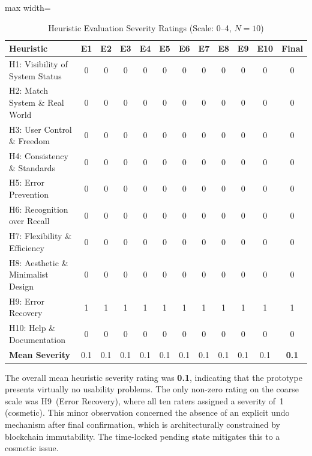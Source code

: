 \documentclass[journal,onecolumn]{IEEEtran}
\begin{document}
\begin{table}[htbp]
\centering
\caption{Heuristic Evaluation Severity Ratings (Scale: 0--4, $N=10$)}
\label{tab:heuristic-results}
\small
\begin{adjustbox}{max width=\columnwidth}
\begin{tabular}{|p{3.0cm}|c|c|c|c|c|c|c|c|c|c|c|}
\hline
\textbf{Heuristic} & \textbf{E1} & \textbf{E2} & \textbf{E3} & \textbf{E4} & \textbf{E5} & \textbf{E6} & \textbf{E7} & \textbf{E8} & \textbf{E9} & \textbf{E10} & \textbf{Final} \\
\hline
H1: Visibility of System Status & 0 & 0 & 0 & 0 & 0 & 0 & 0 & 0 & 0 & 0 & 0 \\
\hline
H2: Match System \& Real World & 0 & 0 & 0 & 0 & 0 & 0 & 0 & 0 & 0 & 0 & 0 \\
\hline
H3: User Control \& Freedom & 0 & 0 & 0 & 0 & 0 & 0 & 0 & 0 & 0 & 0 & 0 \\
\hline
H4: Consistency \& Standards & 0 & 0 & 0 & 0 & 0 & 0 & 0 & 0 & 0 & 0 & 0 \\
\hline
H5: Error Prevention & 0 & 0 & 0 & 0 & 0 & 0 & 0 & 0 & 0 & 0 & 0 \\
\hline
H6: Recognition over Recall & 0 & 0 & 0 & 0 & 0 & 0 & 0 & 0 & 0 & 0 & 0 \\
\hline
H7: Flexibility \& Efficiency & 0 & 0 & 0 & 0 & 0 & 0 & 0 & 0 & 0 & 0 & 0 \\
\hline
H8: Aesthetic \& Minimalist Design & 0 & 0 & 0 & 0 & 0 & 0 & 0 & 0 & 0 & 0 & 0 \\
\hline
H9: Error Recovery & 1 & 1 & 1 & 1 & 1 & 1 & 1 & 1 & 1 & 1 & 1 \\
\hline
H10: Help \& Documentation & 0 & 0 & 0 & 0 & 0 & 0 & 0 & 0 & 0 & 0 & 0 \\
\hline
\textbf{Mean Severity} & 0.1 & 0.1 & 0.1 & 0.1 & 0.1 & 0.1 & 0.1 & 0.1 & 0.1 & 0.1 & \textbf{0.1} \\
\hline
\end{tabular}
\end{adjustbox}
\end{table}

The overall mean heuristic severity rating was \textbf{0.1}, indicating
that the prototype presents virtually no usability problems. The only
non-zero rating on the coarse scale was H9~(Error Recovery), where all ten raters assigned a
severity of~1 (cosmetic). This minor observation concerned the absence
of an explicit undo mechanism after final confirmation, which is
architecturally constrained by blockchain immutability. The time-locked
pending state mitigates this to a cosmetic issue.
\end{document}
